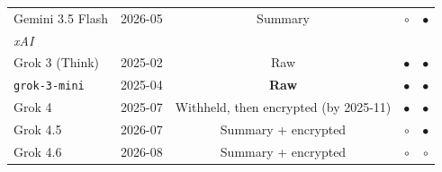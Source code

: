 \documentclass[manuscript,review,anonymous]{acmart}
\newcommand{\nf}[1]{\textcolor{colornotfinal}{#1}} %
\begin{document}
\begin{table}[H]
\begin{tabular}{llccc}
\quad Gemini 3.5 Flash      & 2026-05 & Summary             & $\circ$   & $\bullet$ \\
\multicolumn{5}{l}{\textit{xAI}~\cite{xai2025grok3,oracle2026grok3mini,xai2025reasoningencrypted,xai2026reasoningdocs45,xai2026reasoning, xai2026grok46, xai_reasoning, langchain_chatxai}} \\
\quad Grok 3 (Think)        & 2025-02 & Raw & $\bullet$ & $\bullet$ \\
\quad \texttt{grok-3-mini}  & 2025-04 & \textbf{Raw}        & $\bullet$ & $\bullet$ \\
\quad Grok 4                & 2025-07 & Withheld, then encrypted (by 2025-11) & $\bullet$ & $\bullet$ \\
\quad Grok 4.5              & 2026-07 & 
Summary + encrypted & $\circ$   & $\bullet$ \\
\quad Grok 4.6 & 2026-08 & Summary + encrypted & $\circ$ & $\circ$ \\


\end{tabular}
\end{table}
\end{document}
